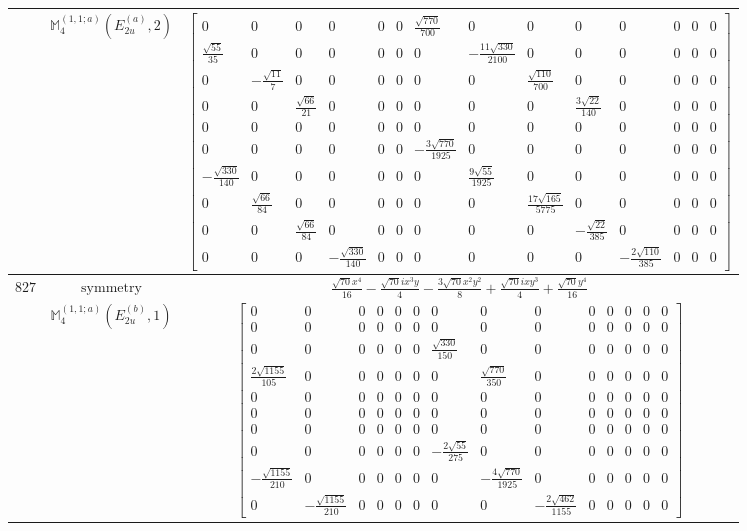 \documentclass[fleqn,8pt,landscape]{jsarticle}
\begin{document}
\begin{longtable}{ccc}
$  $ & $ \mathbb{M}_{4}^{(1,1;a)}(E_{2u}^{(a)},2) $ & $ \begin{bmatrix} 0 & 0 & 0 & 0 & 0 & 0 & \frac{\sqrt{770}}{700} & 0 & 0 & 0 & 0 & 0 & 0 & 0 \\ \frac{\sqrt{55}}{35} & 0 & 0 & 0 & 0 & 0 & 0 & - \frac{11 \sqrt{330}}{2100} & 0 & 0 & 0 & 0 & 0 & 0 \\ 0 & - \frac{\sqrt{11}}{7} & 0 & 0 & 0 & 0 & 0 & 0 & \frac{\sqrt{110}}{700} & 0 & 0 & 0 & 0 & 0 \\ 0 & 0 & \frac{\sqrt{66}}{21} & 0 & 0 & 0 & 0 & 0 & 0 & \frac{3 \sqrt{22}}{140} & 0 & 0 & 0 & 0 \\ 0 & 0 & 0 & 0 & 0 & 0 & 0 & 0 & 0 & 0 & 0 & 0 & 0 & 0 \\ 0 & 0 & 0 & 0 & 0 & 0 & - \frac{3 \sqrt{770}}{1925} & 0 & 0 & 0 & 0 & 0 & 0 & 0 \\ - \frac{\sqrt{330}}{140} & 0 & 0 & 0 & 0 & 0 & 0 & \frac{9 \sqrt{55}}{1925} & 0 & 0 & 0 & 0 & 0 & 0 \\ 0 & \frac{\sqrt{66}}{84} & 0 & 0 & 0 & 0 & 0 & 0 & \frac{17 \sqrt{165}}{5775} & 0 & 0 & 0 & 0 & 0 \\ 0 & 0 & \frac{\sqrt{66}}{84} & 0 & 0 & 0 & 0 & 0 & 0 & - \frac{\sqrt{22}}{385} & 0 & 0 & 0 & 0 \\ 0 & 0 & 0 & - \frac{\sqrt{330}}{140} & 0 & 0 & 0 & 0 & 0 & 0 & - \frac{2 \sqrt{110}}{385} & 0 & 0 & 0 \end{bmatrix} $ \\ \hline
$ 827 $ & $ \text{symmetry} $ & $ \frac{\sqrt{70} x^{4}}{16} - \frac{\sqrt{70} i x^{3} y}{4} - \frac{3 \sqrt{70} x^{2} y^{2}}{8} + \frac{\sqrt{70} i x y^{3}}{4} + \frac{\sqrt{70} y^{4}}{16} $ \\
$  $ & $ \mathbb{M}_{4}^{(1,1;a)}(E_{2u}^{(b)},1) $ & $ \begin{bmatrix} 0 & 0 & 0 & 0 & 0 & 0 & 0 & 0 & 0 & 0 & 0 & 0 & 0 & 0 \\ 0 & 0 & 0 & 0 & 0 & 0 & 0 & 0 & 0 & 0 & 0 & 0 & 0 & 0 \\ 0 & 0 & 0 & 0 & 0 & 0 & \frac{\sqrt{330}}{150} & 0 & 0 & 0 & 0 & 0 & 0 & 0 \\ \frac{2 \sqrt{1155}}{105} & 0 & 0 & 0 & 0 & 0 & 0 & \frac{\sqrt{770}}{350} & 0 & 0 & 0 & 0 & 0 & 0 \\ 0 & 0 & 0 & 0 & 0 & 0 & 0 & 0 & 0 & 0 & 0 & 0 & 0 & 0 \\ 0 & 0 & 0 & 0 & 0 & 0 & 0 & 0 & 0 & 0 & 0 & 0 & 0 & 0 \\ 0 & 0 & 0 & 0 & 0 & 0 & 0 & 0 & 0 & 0 & 0 & 0 & 0 & 0 \\ 0 & 0 & 0 & 0 & 0 & 0 & - \frac{2 \sqrt{55}}{275} & 0 & 0 & 0 & 0 & 0 & 0 & 0 \\ - \frac{\sqrt{1155}}{210} & 0 & 0 & 0 & 0 & 0 & 0 & - \frac{4 \sqrt{770}}{1925} & 0 & 0 & 0 & 0 & 0 & 0 \\ 0 & - \frac{\sqrt{1155}}{210} & 0 & 0 & 0 & 0 & 0 & 0 & - \frac{2 \sqrt{462}}{1155} & 0 & 0 & 0 & 0 & 0 \end{bmatrix} $ \\ \hline

\end{longtable}
\end{document}

